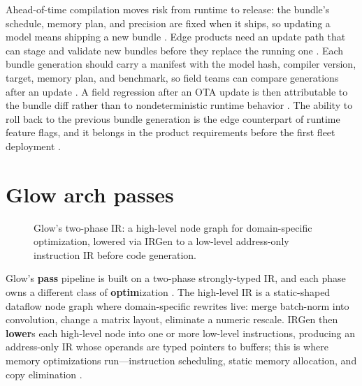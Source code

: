 Ahead-of-time compilation moves risk from runtime to release: the bundle's schedule, memory plan, and precision are fixed when it ships, so updating a model means shipping a new bundle \citep{rotem2018glow,patel2025llminference}. Edge products need an update path that can stage and validate new bundles before they replace the running one \citep{chen2020compilerbasedhardw,memoryfloor2026}. Each bundle generation should carry a manifest with the model hash, compiler version, target, memory plan, and benchmark, so field teams can compare generations after an update \citep{taxbreak2026,patel2025llminference}. A field regression after an OTA update is then attributable to the bundle diff rather than to nondeterministic runtime behavior \citep{rotem2018glow,memoryfloor2026}. The ability to roll back to the previous bundle generation is the edge counterpart of runtime feature flags, and it belongs in the product requirements before the first fleet deployment \citep{amd2024aie,chen2020compilerbasedhardw}.

\section{Glow arch passes}
\label{sec:ch19_glow_arch_passes}


\begin{figure}[t]
\centering
{}
\caption{Glow's two-phase IR: a high-level node graph for domain-specific optimization, lowered via IRGen to a low-level address-only instruction IR before code generation.}
\label{fig:glow_arch_passes_architecture}
\end{figure}

Glow's \textbf{pass} pipeline is built on a two-phase strongly-typed IR, and each phase owns a different class of \textbf{optim}ization \citep{rotem2018glow}. The high-level IR is a static-shaped dataflow node graph where domain-specific rewrites live: merge batch-norm into convolution, change a matrix layout, eliminate a numeric rescale. IRGen then \textbf{lower}s each high-level node into one or more low-level instructions, producing an address-only IR whose operands are typed pointers to buffers; this is where memory optimizations run---instruction scheduling, static memory allocation, and copy elimination \citep{rotem2018glow}.

